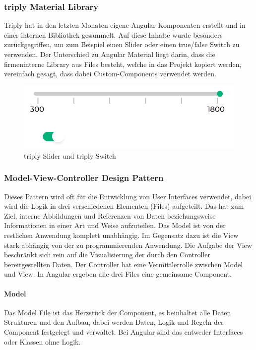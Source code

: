 \subsubsection{triply Material Library}
Triply hat in den letzten Monaten eigene Angular Komponenten erstellt und in einer internen Bibliothek gesammelt.
Auf diese Inhalte wurde besonders zurückgegriffen, um zum Beispiel einen Slider oder einen true/false Switch
zu verwenden.
Der Unterschied zu Angular Material liegt darin, dass die firmeninterne Library aus Files besteht, welche in das Projekt
kopiert werden, vereinfach gesagt, dass dabei Custom-Components verwendet werden.

\begin{figure}[hbt!]
    \centering
    \includegraphics[scale=1]{pics/triply-material-library}
    \caption{triply Slider und triply Switch}
    \label{fig:triply-material-library}
\end{figure}

\subsubsection{Model-View-Controller Design Pattern}
Dieses Pattern wird oft für die Entwicklung von User Interfaces verwendet,
dabei wird die Logik in drei verschiedenen Elementen (Files) aufgeteilt.
Das hat zum Ziel, interne Abbildungen und Referenzen von Daten beziehungsweise Informationen
in einer Art und Weise aufzuteilen.
Das Model ist von der restlichen Anwendung komplett
unabhängig.
Im Gegensatz dazu ist die View stark abhängig von der zu programmierenden Anwendung.
Die Aufgabe der View beschränkt sich rein auf die Visualisierung der durch den Controller bereitgestellten Daten.
Der Controller hat eine Vermittlerrolle zwischen Model und View.
In Angular ergeben alle drei Files eine gemeinsame Component.

\paragraph{Model}
Das Model File ist das Herzstück der Component, es beinhaltet alle Daten
Strukturen und den Aufbau, dabei werden Daten, Logik und Regeln
der Component festgelegt und verwaltet.
Bei Angular sind das entweder Interfaces oder Klassen ohne Logik.
~\cite{angular-design-patterns}


